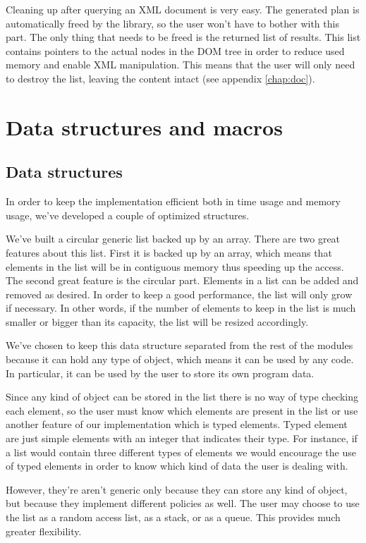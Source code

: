 \documentclass[a4paper]{report}
\begin{document}
	Cleaning up after querying an XML document is very easy. The generated plan is automatically freed by the library, so the user won't have to bother with this part. The only thing that needs to be freed is the returned list of
	results. This list contains pointers to the actual nodes in the DOM tree in order to reduce used memory and enable XML manipulation. This means that the user will only need to destroy the list, leaving the content intact
	(see appendix \ref{chap:doc}).

\section{Data structures and macros}\label{sec:helpers}

	\subsection{Data structures}
		In order to keep the implementation efficient both in time usage and memory usage, we've developed a couple of optimized structures. 
		
		We've built a circular generic list backed up by an array. There are two great features about this list. First it is backed up by an array, which means that elements in the list will be in contiguous memory thus speeding
		up the access. The second great feature is the circular part. Elements in a list can be added and removed as desired. In order to keep a good performance, the list will only grow if necessary. In other words, if the 
		number of elements to keep in the list is much smaller or bigger than its capacity, the list will be resized accordingly.
		
		We've chosen to keep this data structure separated from the rest of the modules because it can hold any type of object, which means it can be used by any code. In particular, it can be used by the user to store its
		own program data.
		
		Since any kind of object can be stored in the list there is no way of type checking each element, so the user must know which elements are present in the list or use another feature of our implementation which is typed 
		elements. Typed element are just simple elements with an integer that indicates their type. For instance, if a list would contain three different types of elements we would encourage the use of typed elements in order 
		to know which kind of data the user is dealing with.
		
		However, they're aren't generic only because they can store any kind of object, but because they implement different policies as well. The user may choose to use the list as a random access list, as a stack, or as a 
		queue. This provides much greater flexibility.
		
\end{document}
